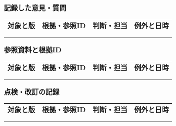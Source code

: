 \documentclass[11pt,a4paper]{article}
\begin{document}
\par{}\noindent\textbf{記録した意見・質問}\par\vspace{1mm}
{\fontsize{8.5}{13}\selectfont
\begin{tabularx}{\linewidth}{@{}XXXX@{}}
\textbf{対象と版} & \textbf{根拠・参照ID} & \textbf{判断・担当} & \textbf{例外と日時}\\[2mm]
\strut & \strut & \strut & \strut\\[5mm]
\strut & \strut & \strut & \strut\\[5mm]
\end{tabularx}
}\vspace{2mm}\par
{}
\par{}\noindent\textbf{参照資料と根拠ID}\par\vspace{1mm}
{\fontsize{8.5}{13}\selectfont
\begin{tabularx}{\linewidth}{@{}XXXX@{}}
\textbf{対象と版} & \textbf{根拠・参照ID} & \textbf{判断・担当} & \textbf{例外と日時}\\[2mm]
\strut & \strut & \strut & \strut\\[5mm]
\strut & \strut & \strut & \strut\\[5mm]
\end{tabularx}
}\vspace{2mm}\par
{}
\par{}\noindent\textbf{点検・改訂の記録}\par\vspace{1mm}
{\fontsize{8.5}{13}\selectfont
\begin{tabularx}{\linewidth}{@{}XXXX@{}}
\textbf{対象と版} & \textbf{根拠・参照ID} & \textbf{判断・担当} & \textbf{例外と日時}\\[2mm]
\strut & \strut & \strut & \strut\\[5mm]
\strut & \strut & \strut & \strut\\[5mm]
\end{tabularx}
}\vspace{2mm}\par
\end{document}
